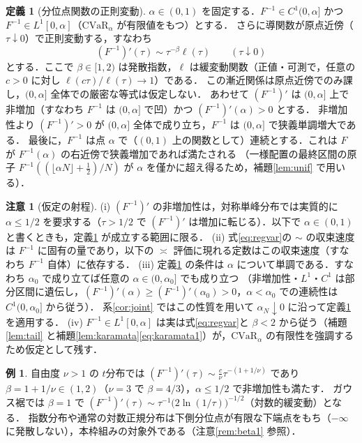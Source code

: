 \documentclass[a4paper,10pt]{jsarticle}
\theoremstyle{definition}
\newtheorem{definition}{定義}[section]
\newtheorem{remark}{注意}[section]
\newtheorem{example}{例}[section]
\newcommand{\CVaR}{\mathrm{CVaR}}
\newcommand{\Finv}{F^{-1}}
\begin{document}
\begin{definition}[分位点関数の正則変動]
\label{def:regvar}
$\alpha\in(0,1)$ を固定する．$\Finv\in C^1(0,\alpha]$ かつ $\Finv\in L^1[0,\alpha]$（$\CVaR_\alpha$ が有限値をもつ）とする．
さらに導関数が原点近傍（$\tau\downarrow0$）で正則変動する，すなわち
\begin{equation}
  (\Finv)'(\tau)\sim\tau^{-\beta}\ell(\tau)\qquad(\tau\downarrow0)
  \label{eq:regvar}
\end{equation}
とする．ここで $\beta\in[1,2)$ は発散指数，$\ell$ は緩変動関数（正値・可測で，任意の $c>0$ に対し $\ell(c\tau)/\ell(\tau)\to1$）である．
この漸近関係は原点近傍でのみ課し，$(0,\alpha]$ 全体での厳密な等式は仮定しない．
あわせて $(\Finv)'$ は $(0,\alpha]$ 上で非増加（すなわち $\Finv$ は $(0,\alpha]$ で凹）かつ $(\Finv)'(\alpha)>0$ とする．
非増加性より $(\Finv)'>0$ が $(0,\alpha]$ 全体で成り立ち，$\Finv$ は $(0,\alpha]$ で狭義単調増大である．
最後に，$\Finv$ は点 $\alpha$ で（$(0,1)$ 上の関数として）連続とする．これは $F$ が $\Finv(\alpha)$ の右近傍で狭義増加であれば満たされる
（一様配置の最終区間の原子 $\Finv((\lfloor\alpha N\rfloor+\frac12)/N)$ が $\alpha$ を僅かに超え得るため，補題\ref{lem:unif} で用いる）．
\end{definition}

\begin{remark}[仮定の射程]
\label{rem:assumption}
(i) $(\Finv)'$ の非増加性は，対称単峰分布では実質的に $\alpha\le1/2$ を要求する（$\tau>1/2$ で $(\Finv)'$ は増加に転じる）．以下で $\alpha\in(0,1)$ と書くときも，定義\ref{def:regvar} が成立する範囲に限る．
(ii) 式\eqref{eq:regvar}の $\sim$ の収束速度は $\Finv$ に固有の量であり，以下の $\asymp$ 評価に現れる定数はこの収束速度（すなわち $\Finv$ 自体）に依存する．
(iii) 定義\ref{def:regvar} の条件は $\alpha$ について単調である．すなわち $\alpha_0$ で成り立てば任意の $\alpha\in(0,\alpha_0]$ でも成り立つ
（非増加性・$L^1$・$C^1$ は部分区間に遺伝し，$(\Finv)'(\alpha)\ge(\Finv)'(\alpha_0)>0$，$\alpha<\alpha_0$ での連続性は $C^1(0,\alpha_0]$ から従う）．
系\ref{cor:joint} ではこの性質を用いて $\alpha_N\downarrow0$ に沿って定義\ref{def:regvar} を適用する．
(iv) $\Finv\in L^1[0,\alpha]$ は実は式\eqref{eq:regvar}と $\beta<2$ から従う（補題\ref{lem:tail} と補題\ref{lem:karamata}\eqref{eq:karamata1}）が，$\CVaR_\alpha$ の有限性を強調するため仮定として残す．
\end{remark}

\begin{example}
自由度 $\nu>1$ の $t$分布では $(\Finv)'(\tau)\sim\frac{c}{\nu}\tau^{-(1+1/\nu)}$ であり $\beta=1+1/\nu\in(1,2)$（$\nu=3$ で $\beta=4/3$），$\alpha\le1/2$ で非増加性も満たす．
ガウス裾では $\beta=1$ で $(\Finv)'(\tau)\sim\tau^{-1}\bigl(2\ln(1/\tau)\bigr)^{-1/2}$（対数的緩変動）となる．
指数分布や通常の対数正規分布は下側分位点が有限な下端点をもち（$-\infty$ に発散しない），本枠組みの対象外である（注意\ref{rem:beta1} 参照）．
\end{example}
\end{document}
